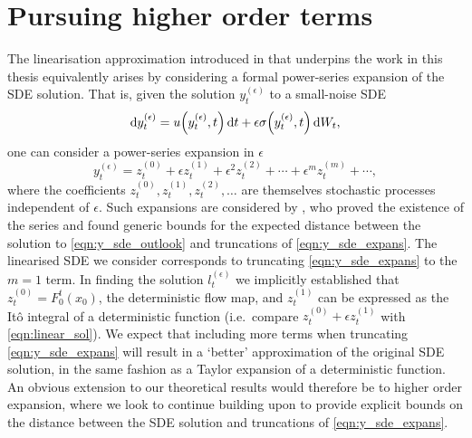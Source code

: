 \section{Pursuing higher order terms}
The linearisation approximation introduced in  that underpins the work in this thesis equivalently arises by considering a formal power-series expansion of the SDE solution.
That is, given the solution \(y_t^{(\epsilon)}\) to a small-noise SDE
\begin{equation}\label{eqn:y_sde_outlook}
	\dif y_t^{(\epsilon)} = u\!\left(y_t^{(\epsilon)}, t\right)\dif t + \epsilon \sigma\!\left(y_t^{(\epsilon)}, t\right)\dif W_t,
\end{equation}
one can consider a power-series expansion in \(\epsilon\)
\begin{equation}\label{eqn:y_sde_expans}
	y_t^{(\epsilon)} = z_t^{(0)} + \epsilon z_t^{(1)} + \epsilon^2 z_t^{(2)} + \dotsb + \epsilon^m z_t^{(m)} + \dotsb,
\end{equation}
where the coefficients \(z_t^{(0)}, z_t^{(1)}, z_t^{(2)}, \dotsc\) are themselves stochastic processes independent of \(\epsilon\).
Such expansions are considered by \citet{Blagoveshchenskii_1962_DiffusionProcessesDepending}, who proved the existence of the series and found generic bounds for the expected distance between the solution to \cref{eqn:y_sde_outlook} and truncations of \cref{eqn:y_sde_expans}.
The linearised SDE we consider corresponds to truncating \cref{eqn:y_sde_expans} to the \(m = 1\) term.
In finding the solution \(l_t^{(\epsilon)}\) we implicitly established that \(z_t^{(0)} = F_0^t\!\left(x_0\right)\), the deterministic flow map, and \(z_t^{(1)}\) can be expressed as the It\^o integral of a deterministic function (i.e.\ compare \(z_t^{(0)} + \epsilon z_t^{(1)}\) with \cref{eqn:linear_sol}).%
We expect that including more terms when truncating \cref{eqn:y_sde_expans} will result in a `better' approximation of the original SDE solution, in the same fashion as a Taylor expansion of a deterministic function.
An obvious extension to our theoretical results would therefore be to higher order expansion, where we look to continue building upon \citet{Blagoveshchenskii_1962_DiffusionProcessesDepending,FreidlinWentzell_1998_RandomPerturbationsDynamical} to provide explicit bounds on the distance between the SDE solution and truncations of \cref{eqn:y_sde_expans}.

